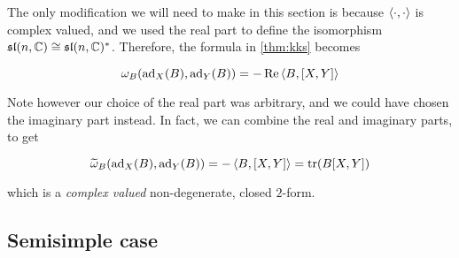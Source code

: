 \documentclass{article}
\renewcommand{\sl}{\mathfrak{sl}}
\renewcommand{\tilde}{\widetilde}
\begin{document}
The only modification we will need to make in this section is because \(\left\langle \cdot, \cdot \right\rangle\) is complex valued, and we used the real part to define the isomorphism \(\sl(n, \C) \cong \sl(n, \C)^*\). Therefore, the formula in \cref{thm:kks} becomes

\[\omega_B(\operatorname{ad}_X(B), \operatorname{ad}_Y(B)) = -\Re\left\langle B, [X, Y] \right\rangle\]

Note however our choice of the real part was arbitrary, and we could have chosen the imaginary part instead. In fact, we can combine the real and imaginary parts, to get

\[\tilde \omega_B(\ad_X(B), \ad_Y(B)) = -\inner{B, [X, Y]} = \tr(B[X,Y])\]

which is a \emph{complex valued} non-degenerate, closed \(2\)-form.



\subsection{Semisimple case}
\end{document}
